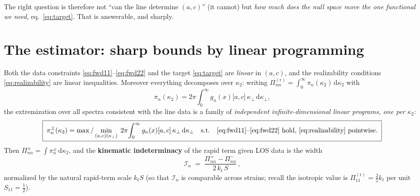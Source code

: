 \documentclass[11pt,a4paper]{article}
\newcommand{\kperp}{\kappa_\perp}
\newcommand{\Pir}[1]{\Pi^{(\mathrm r)}_{#1}}
\newcommand{\dd}{\mathrm{d}}
\begin{document}
The right question is therefore not ``can the line determine $(a,c)$''
(it cannot) but \emph{how much does the null space move the one functional we
need}, eq.~\eqref{eq:target}. That is answerable, and sharply.

\section{The estimator: sharp bounds by linear programming}
\label{sec:estimator}

Both the data constraints \eqref{eq:fwd11}--\eqref{eq:fwd22} and the target
\eqref{eq:target} are \emph{linear} in $(a,c)$, and the realizability
conditions \eqref{eq:realizability} are linear inequalities. Moreover
everything decomposes over $\kappa_2$: writing
$\Pir{nn}=\int_0^\infty \pi_n(\kappa_2)\,\dd\kappa_2$ with
\begin{equation}
  \pi_n(\kappa_2)
  = 2\pi\!\int_0^\infty g_n(x)\bigl[a,c\bigr]\,\kperp\,\dd\kperp ,
\end{equation}
the extremization over all spectra consistent with the line data is a family
of \emph{independent infinite-dimensional linear programs, one per}
$\kappa_2$:
\begin{equation}
\boxed{\;
  \pi_n^{\pm}(\kappa_2)
  = \max/\min_{(a,c)(\kperp)}\;
    2\pi\!\int_0^\infty g_n(x)[a,c]\,\kperp\,\dd\kperp
  \quad\text{s.t.}\quad
  \text{\eqref{eq:fwd11}--\eqref{eq:fwd22} hold, \eqref{eq:realizability}
  pointwise.}
\;}
\label{eq:LP}
\end{equation}
Then $\Pi^{\pm}_{nn}=\int \pi_n^{\pm}\,\dd\kappa_2$, and the
\textbf{kinematic indeterminacy} of the rapid term given LOS data is the
width
\begin{equation}
  \mathcal{I}_n \;=\;
  \frac{\Pi^{+}_{nn}-\Pi^{-}_{nn}}{2\,k_t\,S}\,,
\end{equation}
normalized by the natural rapid-term scale $k_t S$ (so that
$\mathcal{I}_n$ is comparable across strains; recall the isotropic value is
$\Pir{11}=\tfrac25 k_t$ per unit $S_{11}=\tfrac12$).
\end{document}
